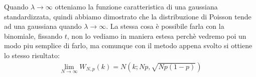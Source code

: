 \documentclass[a4paper, oneside]{article}
\begin{document}
Quando $\lambda \to \infty$ otteniamo la funzione caratteristica di una gaussiana standardizzata, quindi abbiamo dimostrato che la distribuzione di Poisson tende ad una gaussiana quando $\lambda \to \infty$. La stessa cosa è possibile farla con la binomiale, fissando $t$, non lo vediamo in maniera estesa perchè vedremo poi un modo piu semplice di farlo, ma comunque con il metodo appena svolto si ottiene lo stesso risultato:
\begin{gather*}
    \lim_{N \to \infty} W_{N,p}(k) = N(k; Np, \sqrt{Np(1-p)})
\end{gather*}
\end{document}
